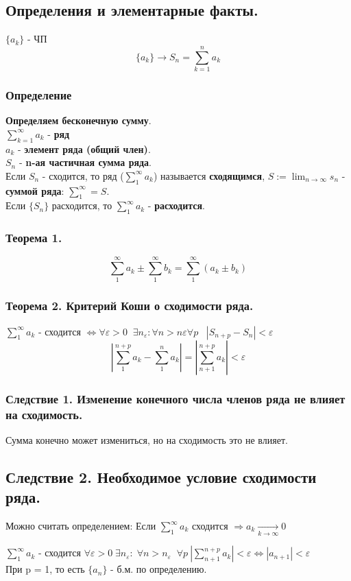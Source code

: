 \documentclass[12pt, paper]{article}
\newcommand{\eps}{\varepsilon}
\begin{document}
\subsection{Определения и элементарные факты.}
$ \{a_k\} $ - ЧП
\[ \{a_k\} \to S_n = \sum^n_{k=1}a_k \]
\subsubsection{Определение}
\begin{tcolorbox}
    \textbf{Определяем бесконечную сумму}.\\
    $\sum^\infty_{k=1} a_k$ - \textbf{ряд}\\
    $a_k$ - \textbf{элемент ряда (общий член)}.\\
    $S_n$ - \textbf{n-ая частичная сумма ряда}.\\
    Если $S_n$ - сходится, то ряд ($\sum^\infty_{1} a_k$) называется \textbf{сходящимся}, $S:=\lim_{n\to\infty} s_n$ - \textbf{суммой ряда}: $\sum_1^\infty = S$.\\
    Если $\{S_n\}$ расходится, то $\sum^\infty_{1} a_k$ - \textbf{расходится}.
\end{tcolorbox}
\subsubsection{\textbf{Теорема 1.}}
\[ \sum_1^\infty a_k \pm \sum_1^\infty b_k = \sum_1^\infty (a_k \pm b_k) \]
\subsubsection{\textbf{Теорема 2. Критерий Коши о сходимости ряда.}}
$ \sum_1^\infty a_k$ - сходится $\Leftrightarrow \forall \eps > 0\;\; \exists n_\eps : \forall n > n\eps \forall p \;\;\; |S_{n+p} - S_n| < \eps $
\[ |\sum_1^{n+p} a_k - \sum_1^n a_k| = |\sum_{n+1}^{n+p} a_k| < \eps \]
\subsubsection{\textbf{Следствие 1. Изменение конечного числа членов ряда не влияет на сходимость.}}
Сумма конечно может измениться, но на сходимость это не влияет.
\subsection{\textbf{Следствие 2. Необходимое условие сходимости ряда.}}
Можно считать определением: Если $\sum_1^\infty a_k$ сходится $\Rightarrow a_k \xrightarrow[k\to\infty]{} 0$\\
\begin{tcolorbox}[title=Доказательство]
    $\sum_1^\infty a_k$ - сходится $\forall \eps > 0\; \exists n_\eps:\; \forall n > n_\eps\;\; \forall p \ |\sum_{n+1}^{n+p} a_k| < \eps \Leftrightarrow |a_{n+1}| < \eps$\\
    При p = 1, то есть $\{a_n\}$ - б.м. по определению.
\end{tcolorbox}
\end{document}
